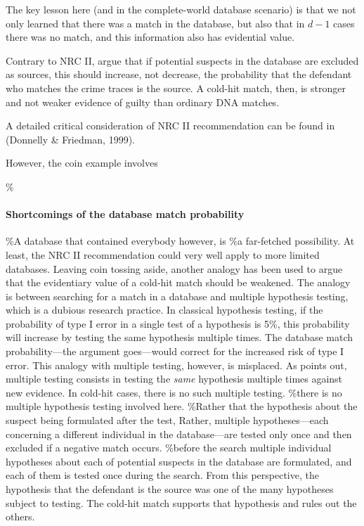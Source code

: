\documentclass[10pt,dvipsnames,enabledeprecatedfontcommands]{scrartcl}
\let\oldparagraph\paragraph
\renewcommand{\paragraph}[1]{\oldparagraph{#1}\mbox{}}
\begin{document}
The key lesson here (and in the complete-world database scenario) is
that we not only learned that there was a match in the database, but
also that in \(d-1\) cases there was no match, and this information also
has evidential value.

Contrary to NRC II, \cite{donnelly1999DNADatabaseSearches} argue that if
potential suspects in the database are excluded as sources, this should
increase, not decrease, the probability that the defendant who matches
the crime traces is the source. A cold-hit match, then, is stronger and
not weaker evidence of guilty than ordinary DNA matches.

A detailed critical consideration of NRC II recommendation can be found
in (Donnelly \& Friedman, 1999).

However, the coin example involves

\%\paragraph{Shortcomings of the database match probability}

\%A database that contained everybody however, is \%a far-fetched
possibility. At least, the NRC II recommendation could very well apply
to more limited databases. Leaving coin tossing aside, another analogy
has been used to argue that the evidentiary value of a cold-hit match
should be weakened. The analogy is between searching for a match in a
database and multiple hypothesis testing, which is a dubious research
practice. In classical hypothesis testing, if the probability of type I
error in a single test of a hypothesis is 5\%, this probability will
increase by testing the same hypothesis multiple times. The database
match probability---the argument goes---would correct for the increased
risk of type I error. This analogy with multiple testing, however, is
misplaced. As \citet{balding2002DNDatabaseSearch} points out, multiple
testing consists in testing the \textit{same} hypothesis multiple times
against new evidence. In cold-hit cases, there is no such multiple
testing. \%there is no multiple hypothesis testing involved here.
\%Rather that the hypothesis about the suspect being formulated after
the test, Rather, multiple hypotheses---each concerning a different
individual in the database---are tested only once and then excluded if a
negative match occurs. \%before the search multiple individual
hypotheses about each of potential suspects in the database are
formulated, and each of them is tested once during the search. From this
perspective, the hypothesis that the defendant is the source was one of
the many hypotheses subject to testing. The cold-hit match supports that
hypothesis and rules out the others.
\end{document}
